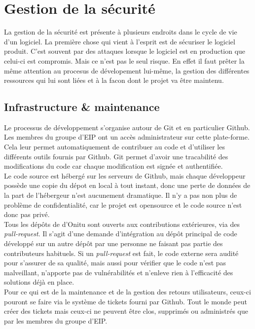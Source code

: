 \section{Gestion de la sécurité}

La gestion de la sécurité est présente à plusieurs endroits dans le cycle de vie d'un logiciel. La première chose qui vient à l'esprit est de sécuriser le logiciel produit. C'est souvent par des attaques lorsque le logiciel est en production que celui-ci est compromis. Mais ce n'est pas le seul risque. En effet il faut prêter la même attention au procesus de dévelopement lui-même, la gestion des différentes ressources qui lui sont liées et à la facon dont le projet va être maintenu.

\subsection{Infrastructure \& maintenance}

Le processus de développement s'organise autour de Git et en particulier Github. Les membres du groupe d'EIP ont un accès administrateur sur cette plate-forme. Cela leur permet automatiquement de contribuer au code et d'utiliser les différents outils fournis par Github. Git permet d'avoir une tracabilité des modifications du code car chaque modification est signée et authentifiée.\\

Le code source est hébergé sur les serveurs de Github, mais chaque développeur possède une copie du dépot en local à tout instant, donc une perte de données de la part de l'hébergeur n'est aucunement dramatique. Il n'y a pas non plus de problème de confidentialité, car le projet est opensource et le code source n'est donc pas privé.\\

Tous les dépôts de d'Onitu sont ouverts aux contributions extérieures, via des \textit{pull-request}. Il s'agit d'une demande d'intégration au dépôt principal de code développé sur un autre dépôt par une personne ne faisant pas partie des contributeurs habituels. Si un \textit{pull-request} est fait, le code externe sera audité pour s'assurer de sa qualité, mais aussi pour vérifier que le code n'est pas malveillant, n'apporte pas de vulnérabilités et n'enleve rien à l'efficacité des solutions déjà en place.\\

Pour ce qui est de la maintenance et de la gestion des retours utilisateurs, ceux-ci pouront se faire via le système de tickets fourni par Github. Tout le monde peut créer des tickets mais ceux-ci ne peuvent être clos, supprimés ou administrés que par les membres du groupe d'EIP.

